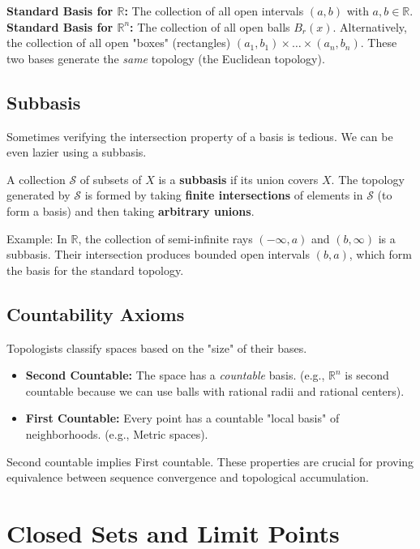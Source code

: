 \documentclass[oneside]{book}
\begin{document}
\textbf{Standard Basis for $\mathbb{R}$:} The collection of all open intervals $(a, b)$ with $a, b \in \mathbb{R}$.
\textbf{Standard Basis for $\mathbb{R}^n$:} The collection of all open balls $B_r(x)$. Alternatively, the collection of all open "boxes" (rectangles) $(a_1, b_1) \times \dots \times (a_n, b_n)$. These two bases generate the \textit{same} topology (the Euclidean topology).

\subsection{Subbasis}

Sometimes verifying the intersection property of a basis is tedious. We can be even lazier using a subbasis.
\begin{definition}[Subbasis]
A collection $\mathcal{S}$ of subsets of $X$ is a \textbf{subbasis} if its union covers $X$. The topology generated by $\mathcal{S}$ is formed by taking \textbf{finite intersections} of elements in $\mathcal{S}$ (to form a basis) and then taking \textbf{arbitrary unions}.
\end{definition}

Example: In $\mathbb{R}$, the collection of semi-infinite rays $(-\infty, a)$ and $(b, \infty)$ is a subbasis. Their intersection produces bounded open intervals $(b, a)$, which form the basis for the standard topology.

\subsection{Countability Axioms}
Topologists classify spaces based on the "size" of their bases.
\begin{itemize}
    \item \textbf{Second Countable:} The space has a \textit{countable} basis. (e.g., $\mathbb{R}^n$ is second countable because we can use balls with rational radii and rational centers).
    \item \textbf{First Countable:} Every point has a countable "local basis" of neighborhoods. (e.g., Metric spaces).
\end{itemize}
Second countable implies First countable. These properties are crucial for proving equivalence between sequence convergence and topological accumulation.

\section{Closed Sets and Limit Points}
\end{document}
